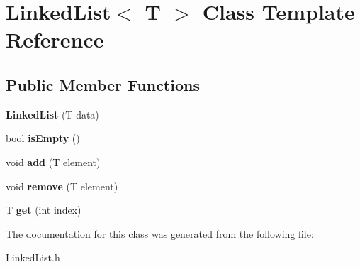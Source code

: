 \hypertarget{class_linked_list}{}\section{Linked\+List$<$ T $>$ Class Template Reference}
\label{class_linked_list}
\subsection*{Public Member Functions}
\begin{DoxyCompactItemize}
\item 
\mbox{\label{class_linked_list_af9b832a7649af3c40420782ecef9e205}} 
{\bfseries Linked\+List} (T data)
\item 
\mbox{\label{class_linked_list_a7ecbb28e82117a680839ed0dc28ebdce}} 
bool {\bfseries is\+Empty} ()
\item 
\mbox{\label{class_linked_list_ab7364799e5965dd59d4f5952cb953287}} 
void {\bfseries add} (T element)
\item 
\mbox{\label{class_linked_list_a6c4973ae9956ddb037a9093cffa2adb1}} 
void {\bfseries remove} (T element)
\item 
\mbox{\label{class_linked_list_a25079ed9b408efad63a1522c818d8705}} 
T {\bfseries get} (int index)
\end{DoxyCompactItemize}


The documentation for this class was generated from the following file\+:\begin{DoxyCompactItemize}
\item 
Linked\+List.\+h\end{DoxyCompactItemize}
